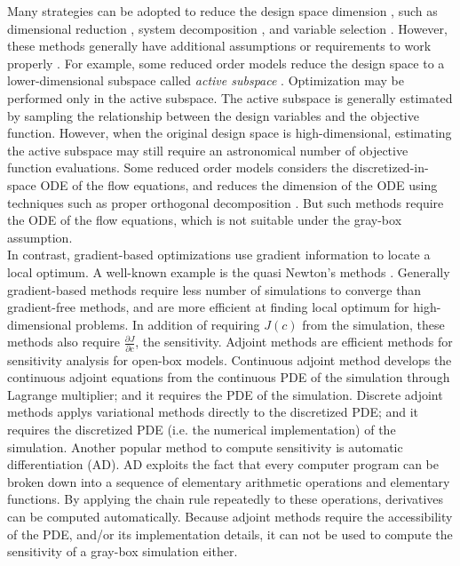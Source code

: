 \documentclass[a4paper,onecolumn]{article}
\theoremstyle{remark}
\begin{document}
\noindent Many strategies can be adopted to reduce the design space dimension 
\cite{survey of high dimensional blackbox optimization}, such as
dimensional reduction \cite{dimensional reduction}, system decomposition \cite{decomposition},
and variable selection \cite{variable selection}. However, these methods generally have 
additional assumptions or requirements to work properly \cite{survey of high dimensional blackbox 
optimization}. For example, some reduced order models reduce the design space
to a lower-dimensional subspace called \emph{active subspace} \cite{Han AIAA, Active subspace}.
Optimization may be performed only in the active subspace. The active subspace is generally estimated 
by sampling the relationship between the design variables and the objective function.  
However, when the original design space is high-dimensional, estimating the active subspace 
may still require an astronomical number of objective function evaluations. 
Some reduced order models considers the discretized-in-space ODE of the flow equations,
and reduces the dimension of the ODE using techniques such as proper 
orthogonal decomposition \cite{Balanced truncation}. But such methods require 
the ODE of the flow equations, which is not suitable under the gray-box assumption.\\

\noindent In contrast, gradient-based optimizations use gradient information to locate a local optimum.
A well-known example is the quasi Newton's methods \cite{quasiNewton}. 
Generally gradient-based methods require less number of simulations 
to converge than gradient-free methods, and are more efficient at finding local optimum for high-dimensional problems.
In addition of requiring $J(c)$ from the simulation,
these methods also require $\frac{\partial J}{\partial c}$, the sensitivity.
Adjoint methods are efficient methods for sensitivity analysis\cite{cont discretize adjoint}
for open-box models.
Continuous adjoint method develops the continuous adjoint equations from the continuous PDE of the simulation through 
Lagrange multiplier; and it requires the PDE of the simulation. 
Discrete adjoint methods applys variational methods directly to the discretized PDE; and it requires the
discretized PDE (i.e. the numerical implementation) of the simulation.
Another popular method to compute sensitivity is automatic differentiation (AD)\cite{automaticdiff}.
AD exploits the fact that every computer program can be broken down into a sequence of elementary arithmetic operations
and elementary functions. By applying the chain rule repeatedly to these operations, 
derivatives can be computed automatically. Because adjoint methods require
the accessibility of the PDE, and/or its implementation details, 
it can not be used to compute the sensitivity of a gray-box simulation either.\\
\end{document}
